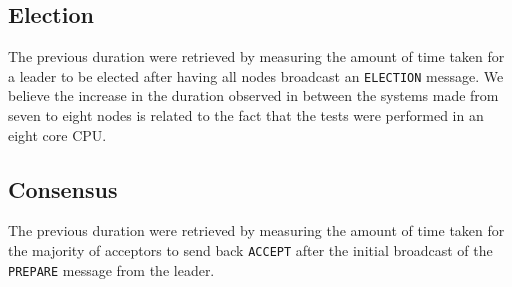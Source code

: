 \documentclass[11pt]{article}
\begin{document}
\subsection{Election}
The previous duration were retrieved by measuring the amount of time taken for a
leader to be elected after having all nodes broadcast an \texttt{ELECTION}
message. We believe the increase in the duration observed in between the
systems made from seven to eight nodes is related to the fact that the tests
were performed in an eight core CPU.
\subsection{Consensus}
The previous duration were retrieved by measuring the amount of time taken for
the majority of acceptors to send back \texttt{ACCEPT} after the initial
broadcast of the \texttt{PREPARE} message from the leader.
\end{document}

